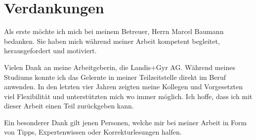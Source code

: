 \section{Verdankungen}

Als erste möchte ich mich bei meinem Betreuer, Herrn Marcel Baumann bedanken.
Sie haben mich während meiner Arbeit kompetent begleitet, herausgefordert und motiviert.

Vielen Dank an meine Arbeitgeberin, die Landis+Gyr AG.
Während meines Studiums konnte ich das Gelernte in meiner Teilzeitstelle direkt im Beruf anwenden.
In den letzten vier Jahren zeigten meine Kollegen und Vorgesetzten viel Flexibilität und unterstützten mich wo immer möglich.
Ich hoffe, dass ich mit dieser Arbeit einen Teil zurückgeben kann.

Ein besonderer Dank gilt jenen Personen, welche mir bei meiner Arbeit in Form von Tipps, Expertenwissen oder Korrekturlesungen halfen.